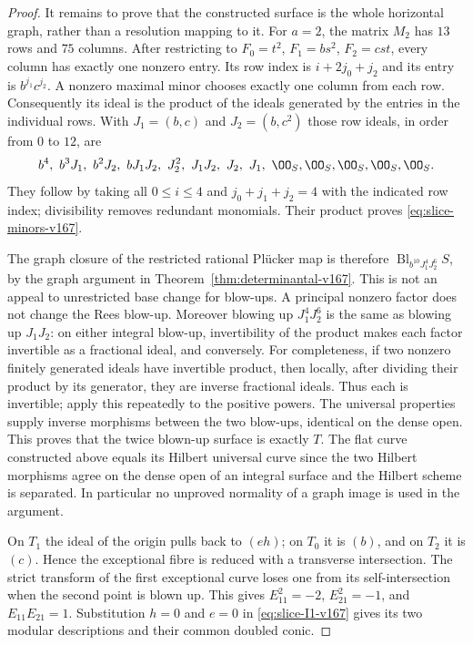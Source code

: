\begin{proof}
It remains to prove that the constructed surface is the whole
horizontal graph, rather than a resolution mapping to it.
For $a=2$, the matrix $M_2$ has $13$ rows and $75$ columns.
After restricting to $F_0=t^2$, $F_1=bs^2$, $F_2=cst$,
every column has exactly one nonzero entry. Its row index is
$i+2j_0+j_2$ and its entry is $b^{j_1}c^{j_2}$. A nonzero
maximal minor chooses exactly one column from each row.
Consequently its ideal is the product of the ideals generated
by the entries in the individual rows. With $J_1=(b,c)$ and
$J_2=(b,c^2)$ those row ideals, in order from $0$ to $12$, are
\[
 b^4,\ b^3J_1,\ b^2J_2,\ bJ_1J_2,\ J_2^2,\ J_1J_2,
                  \ J_2,\ J_1,\ \OO_S,\OO_S,\OO_S,\OO_S,\OO_S.
\]
They follow by taking all $0\leq i\leq4$ and
$j_0+j_1+j_2=4$ with the indicated row index; divisibility removes
redundant monomials. Their product proves
\eqref{eq:slice-minors-v167}.

The graph closure of the restricted rational Pl\"ucker map is
therefore $\operatorname{Bl}_{b^{10}J_1^4J_2^6}S$, by the graph
argument in Theorem~\ref{thm:determinantal-v167}. This is not an
appeal to unrestricted base change for blow-ups. A principal
nonzero factor does not change the Rees blow-up. Moreover blowing
up $J_1^4J_2^6$ is the same as blowing up $J_1J_2$: on either
integral blow-up, invertibility of the product makes each factor
invertible as a fractional ideal, and conversely. For completeness,
if two nonzero finitely generated ideals have invertible product,
then locally, after dividing their product by its generator, they
are inverse fractional ideals. Thus each is invertible; apply
this repeatedly to the positive powers. The universal properties
supply inverse morphisms between the two blow-ups, identical on
the dense open. This proves that the twice blown-up surface is
exactly $T$. The flat curve constructed above equals its Hilbert
universal curve since the two Hilbert morphisms agree on the
dense open of an integral surface and the Hilbert scheme is
separated. In particular no unproved normality of a graph image
is used in the argument.

On $T_1$ the ideal of the origin pulls back to $(eh)$; on $T_0$
it is $(b)$, and on $T_2$ it is $(c)$. Hence the exceptional fibre
is reduced with a transverse intersection. The strict transform
of the first exceptional curve loses one from its self-intersection
when the second point is blown up. This gives $E_{11}^2=-2$,
$E_{21}^2=-1$, and $E_{11}E_{21}=1$. Substitution $h=0$ and $e=0$
in \eqref{eq:slice-I1-v167} gives its two modular descriptions and
their common doubled conic.
\end{proof}

